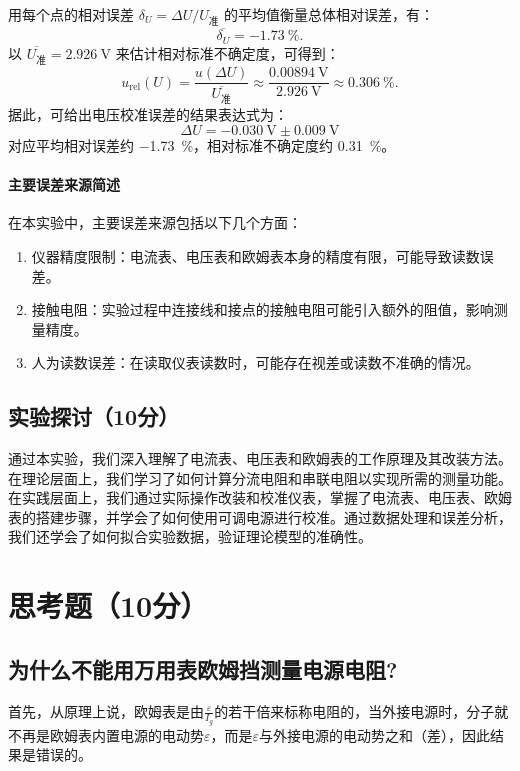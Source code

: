 \documentclass[]{../template/Report}%
\begin{document}
\begin{fullreportonly}
    用每个点的相对误差 $\delta_U=\Delta U/U_\text{准}$ 的平均值衡量总体相对误差，有：
    \begin{equation}
        \overline{\delta_U}=\SI{-1.73}{\percent}.
    \end{equation}
    以 $\overline{U_\text{准}}=\SI{2.926}{\volt}$ 来估计相对标准不确定度，可得到：
    \begin{equation}
        u_\text{rel}(U) = \frac{u(\Delta U)}{\overline{U_\text{准}}} \approx \frac{\SI{0.00894}{\volt}}{\SI{2.926}{\volt}} \approx \SI{0.306}{\percent}.
    \end{equation}
    据此，可给出电压校准误差的结果表达式为：
    \begin{equation}
        \boxed{\Delta U = \SI{-0.030}{\volt} \pm \SI{0.009}{\volt}}
    \end{equation}
    对应平均相对误差约 \SI{-1.73}{\percent}，相对标准不确定度约 \SI{0.31}{\percent}。

    \paragraph{主要误差来源简述}
    在本实验中，主要误差来源包括以下几个方面：
    \begin{enumerate}
        \item 仪器精度限制：电流表、电压表和欧姆表本身的精度有限，可能导致读数误差。
        \item 接触电阻：实验过程中连接线和接点的接触电阻可能引入额外的阻值，影响测量精度。
        \item 人为读数误差：在读取仪表读数时，可能存在视差或读数不准确的情况。
    \end{enumerate}

    \subsection{实验探讨（10分）}
    通过本实验，我们深入理解了电流表、电压表和欧姆表的工作原理及其改装方法。在理论层面上，我们学习了如何计算分流电阻和串联电阻以实现所需的测量功能。
    在实践层面上，我们通过实际操作改装和校准仪表，掌握了电流表、电压表、欧姆表的搭建步骤，并学会了如何使用可调电源进行校准。通过数据处理和误差分析，我们还学会了如何拟合实验数据，验证理论模型的准确性。

    \section{思考题（10分）}
    \subsection{为什么不能用万用表欧姆挡测量电源电阻?}
    首先，从原理上说，欧姆表是由$\frac{\varepsilon}{I_g}$的若干倍来标称电阻的，当外接电源时，分子就不再是欧姆表内置电源的电动势$\varepsilon$，而是$\varepsilon$与外接电源的电动势之和（差），因此结果是错误的。


\end{fullreportonly}
\end{document}
